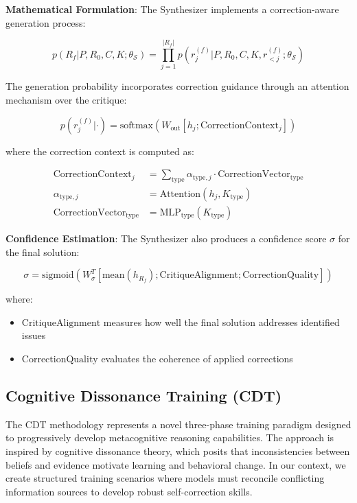 \documentclass[10pt,twocolumn]{article}
\newcommand{\cdt}{\textsc{CDT}}
\newcommand{\Synthesizer}{\mathcal{S}}
\begin{document}
\textbf{Mathematical Formulation}: The Synthesizer implements a correction-aware generation process:

\begin{equation}
p(R_f | P, R_0, C, K; \theta_\Synthesizer) = \prod_{j=1}^{|R_f|} p(r_j^{(f)} | P, R_0, C, K, r_{<j}^{(f)}; \theta_\Synthesizer)
\end{equation}

The generation probability incorporates correction guidance through an attention mechanism over the critique:

\begin{equation}
p(r_j^{(f)} | \cdot) = \text{softmax}(W_{\text{out}} [h_j; \text{CorrectionContext}_j])
\end{equation}

where the correction context is computed as:

\begin{align}
\text{CorrectionContext}_j &= \sum_{\text{type}} \alpha_{\text{type},j} \cdot \text{CorrectionVector}_{\text{type}} \\
\alpha_{\text{type},j} &= \text{Attention}(h_j, K_{\text{type}}) \\
\text{CorrectionVector}_{\text{type}} &= \text{MLP}_{\text{type}}(K_{\text{type}})
\end{align}

\textbf{Confidence Estimation}: The Synthesizer also produces a confidence score $\sigma$ for the final solution:

\begin{equation}
\sigma = \text{sigmoid}(W_{\sigma}^T [\text{mean}(h_{R_f}); \text{CritiqueAlignment}; \text{CorrectionQuality}])
\end{equation}

where:
\begin{itemize}[leftmargin=*]
\item $\text{CritiqueAlignment}$ measures how well the final solution addresses identified issues
\item $\text{CorrectionQuality}$ evaluates the coherence of applied corrections
\end{itemize}

\subsection{Cognitive Dissonance Training (\cdt{})}

The \cdt{} methodology represents a novel three-phase training paradigm designed to progressively develop metacognitive reasoning capabilities. The approach is inspired by cognitive dissonance theory, which posits that inconsistencies between beliefs and evidence motivate learning and behavioral change. In our context, we create structured training scenarios where models must reconcile conflicting information sources to develop robust self-correction skills.
\end{document}
